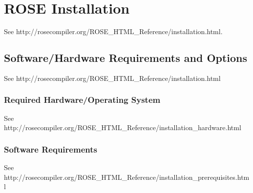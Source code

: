 \section{ROSE Installation}

See http://rosecompiler.org/ROSE\_HTML\_Reference/installation.html.

\subsection{Software/Hardware Requirements and Options}
\label{Requirements_Installation_Testing}

See http://rosecompiler.org/ROSE\_HTML\_Reference/installation.html


\subsubsection{Required Hardware/Operating System}

See http://rosecompiler.org/ROSE\_HTML\_Reference/installation\_hardware.html


\subsubsection{Software Requirements}

See http://rosecompiler.org/ROSE\_HTML\_Reference/installation\_prerequisites.html

